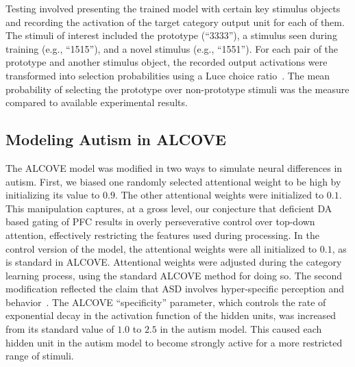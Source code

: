 Testing involved presenting the trained model with certain key stimulus objects and recording the activation of the target category output unit for each of them. The stimuli of interest included the prototype (``3333''), a stimulus seen during training (e.g., ``1515''), and a novel stimulus (e.g., ``1551''). For each pair of the prototype and another stimulus object, the recorded output activations were transformed into selection probabilities using a Luce choice ratio~\cite{Luce:1963}. The mean probability of selecting the prototype over non-prototype stimuli was the measure compared to available experimental results.


\subsection{Modeling Autism in ALCOVE}
The ALCOVE model was modified in two ways to simulate neural differences in autism. First, we biased one randomly selected attentional weight to be high by initializing its value to $0.9$. The other attentional weights were initialized to $0.1$. This manipulation captures, at a gross level, our conjecture that deficient DA based gating of PFC results in overly perseverative control over top-down attention, effectively restricting the features used during processing. In the control version of the model, the attentional weights were all initialized to $0.1$, as is standard in ALCOVE. Attentional weights were adjusted during the category learning process, using the standard ALCOVE method for doing so. The second modification reflected the claim that ASD involves hyper-specific perception and behavior~\cite{HappeF:1999:WCC}. The ALCOVE ``specificity'' parameter, which controls the rate of exponential decay in the activation function of the hidden units, was increased from its standard value of $1.0$ to $2.5$ in the autism model. This caused each hidden unit in the autism model to become strongly active for a more restricted range of stimuli.

